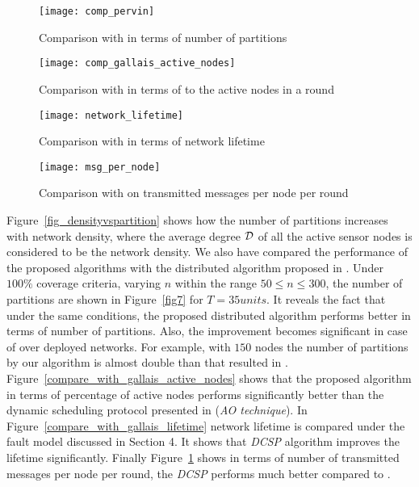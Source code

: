 \documentclass{acm_proc_article-sp}
\begin{document}
\begin{figure}[ht!]
\begin{minipage}[b]{0.425\linewidth}
		  \centering
		   \texttt{[image: comp\_pervin]}
		  \caption{\scriptsize{Comparison with \cite{Pervin} in terms of number of partitions }}
		  \label{fig7}
	      \end{minipage}
	      \hspace{0.8cm}
	      \begin{minipage}[b]{0.45\linewidth}
		  \centering
		  \texttt{[image: comp\_gallais\_active\_nodes]}
		  \caption{\scriptsize{Comparison with \cite{Gallais} in terms of to the active nodes in a round}}
		  \label{compare_with_gallais_active_nodes}
	      \end{minipage}
\begin{minipage}[b]{0.40\linewidth}
		  \centering
		    \texttt{[image: network\_lifetime]} 
		  \caption{\scriptsize{Comparison with \cite{Gallais} in terms of network lifetime }}
		  \label{compare_with_gallais_lifetime}
		\end{minipage}
		      \hspace{0.8cm}
		\begin{minipage}[b]{0.46\linewidth}
		  \centering
		  \texttt{[image: msg\_per\_node]}
		  \caption{\scriptsize{Comparison with \cite{Gallais} on transmitted messages per node per round}}
		  \label{compare_with_gallais_messages}
	      \end{minipage}
		\end{figure}
 Figure~\ref{fig_densityvspartition} shows how the number of partitions increases with network density, where the average degree ${\cal D}$ of all the active sensor nodes is considered to be the network density.
 We also have compared the performance of the proposed algorithms with the distributed algorithm proposed in \cite{Pervin}. Under $100\%$ coverage criteria, varying $n$ within the range $50 \leq n \leq 300$, the number of partitions are shown in Figure~\ref{fig7} for $T=35 units$. It reveals the fact that under the same conditions, the proposed distributed algorithm performs better in terms of number of partitions. Also, the improvement becomes significant in case of over deployed networks. For example, with $150$ nodes the number of partitions by our algorithm is almost double than that resulted in \cite{Pervin}.
Figure~\ref{compare_with_gallais_active_nodes} shows that the proposed algorithm in terms of percentage of active nodes performs significantly better than the dynamic scheduling protocol presented in \cite{Gallais} ({\it AO technique}). In Figure~\ref{compare_with_gallais_lifetime} network lifetime is compared under the fault model discussed in Section 4. It shows that {\it DCSP} algorithm improves the lifetime significantly. Finally  Figure~\ref{compare_with_gallais_messages} shows in terms of number of transmitted messages per node per round, the {\it DCSP} performs much better compared to \cite{Gallais}.
\end{document}
